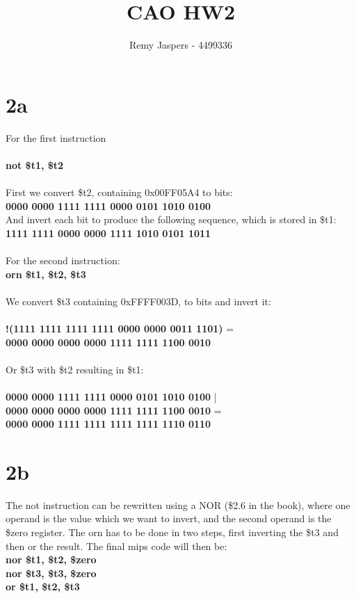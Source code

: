 \documentclass[10pt,a4paper]{article}
\author{Remy Jaspers - 4499336}
\title{CAO HW2}
\begin{document}
	\maketitle
	\section{}
	\section*{2a}
	For the first instruction \\\\ \textbf{not \$t1, \$t2} \\\\ First we convert \$t2, containing 0x00FF05A4 to bits: \\
	
\noindent	\textbf{0000 0000 1111 1111 0000 0101 1010 0100} \\
	
\noindent And invert each bit to produce the following sequence,
which is stored in \$t1: \\
	
\noindent	\textbf{1111 1111 0000 0000 1111 1010 0101 1011} \\\\

\noindent For the second instruction: \\

\noindent \textbf{orn \$t1, \$t2, \$t3} \\\\
\noindent We convert \$t3 containing 0xFFFF003D, to bits and invert it:\\\\
\noindent \textbf{!(1111 1111 1111 1111 0000 0000 0011 1101)} =   \\
\noindent \textbf{0000 0000 0000 0000 1111 1111 1100 0010} \\\\
\noindent Or \$t3 with \$t2 resulting in \$t1: \\\\
\noindent \textbf{0000 0000 1111 1111 0000 0101 1010 0100} | \\
\noindent \textbf{0000 0000 0000 0000 1111 1111 1100 0010} = \\
\noindent \textbf{0000 0000 1111 1111 1111 1111 1110 0110}
\section*{2b}
The not instruction can be rewritten using a NOR (\$2.6 in the book), where one operand is the value which we want to invert, and the second operand is the \$zero register. The orn has to be done in two steps, first inverting the \$t3 and then or the result. The final mips code will then be:\\
\noindent \textbf{nor \$t1, \$t2, \$zero} \\
\noindent \textbf{nor \$t3, \$t3, \$zero} \\
\noindent \textbf{or  \$t1, \$t2, \$t3} \\
\end{document}
